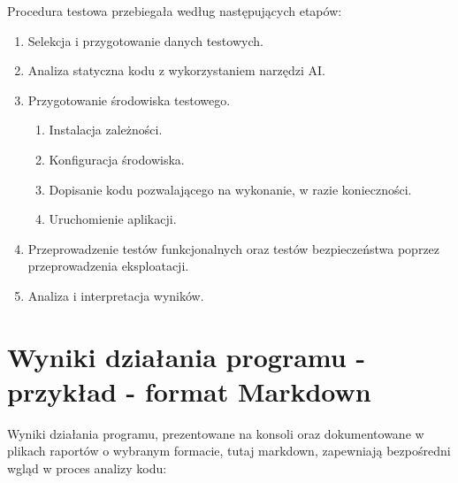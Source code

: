 Procedura testowa przebiegała według następujących etapów:
\begin{enumerate}
    \item Selekcja i przygotowanie danych testowych.
    \item Analiza statyczna kodu z wykorzystaniem narzędzi AI.
    \item Przygotowanie środowiska testowego.
    \begin{enumerate}
        \item Instalacja zależności.
        \item Konfiguracja środowiska.
        \item Dopisanie kodu pozwalającego na wykonanie, w razie konieczności.
        \item Uruchomienie aplikacji.
    \end{enumerate} 
    \item Przeprowadzenie testów funkcjonalnych oraz testów bezpieczeństwa poprzez przeprowadzenia eksploatacji.
    \item Analiza i interpretacja wyników.
\end{enumerate}

\section{Wyniki działania programu - przykład - format Markdown}
\label{sec:wyniki_dzialania_programu}

Wyniki działania programu, prezentowane na konsoli oraz dokumentowane w plikach raportów o wybranym formacie, tutaj markdown, zapewniają bezpośredni wgląd w proces analizy kodu: \\


